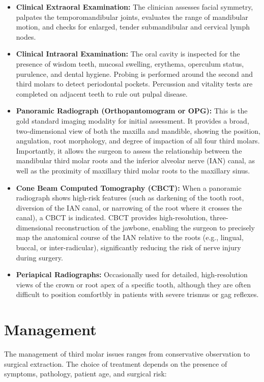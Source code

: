 \begin{itemize}
    \item \textbf{Clinical Extraoral Examination:} The clinician assesses facial symmetry, palpates the temporomandibular joints, evaluates the range of mandibular motion, and checks for enlarged, tender submandibular and cervical lymph nodes.
    \item \textbf{Clinical Intraoral Examination:} The oral cavity is inspected for the presence of wisdom teeth, mucosal swelling, erythema, operculum status, purulence, and dental hygiene. Probing is performed around the second and third molars to detect periodontal pockets. Percussion and vitality tests are completed on adjacent teeth to rule out pulpal disease.
    \item \textbf{Panoramic Radiograph (Orthopantomogram or OPG):} This is the gold standard imaging modality for initial assessment. It provides a broad, two-dimensional view of both the maxilla and mandible, showing the position, angulation, root morphology, and degree of impaction of all four third molars. Importantly, it allows the surgeon to assess the relationship between the mandibular third molar roots and the inferior alveolar nerve (IAN) canal, as well as the proximity of maxillary third molar roots to the maxillary sinus.
    \item \textbf{Cone Beam Computed Tomography (CBCT):} When a panoramic radiograph shows high-risk features (such as darkening of the tooth root, diversion of the IAN canal, or narrowing of the root where it crosses the canal), a CBCT is indicated. CBCT provides high-resolution, three-dimensional reconstruction of the jawbone, enabling the surgeon to precisely map the anatomical course of the IAN relative to the roots (e.g., lingual, buccal, or inter-radicular), significantly reducing the risk of nerve injury during surgery.
    \item \textbf{Periapical Radiographs:} Occasionally used for detailed, high-resolution views of the crown or root apex of a specific tooth, although they are often difficult to position comfortbly in patients with severe trismus or gag reflexes.
\end{itemize}

\section*{Management}
The management of third molar issues ranges from conservative observation to surgical extraction. The choice of treatment depends on the presence of symptoms, pathology, patient age, and surgical risk:

